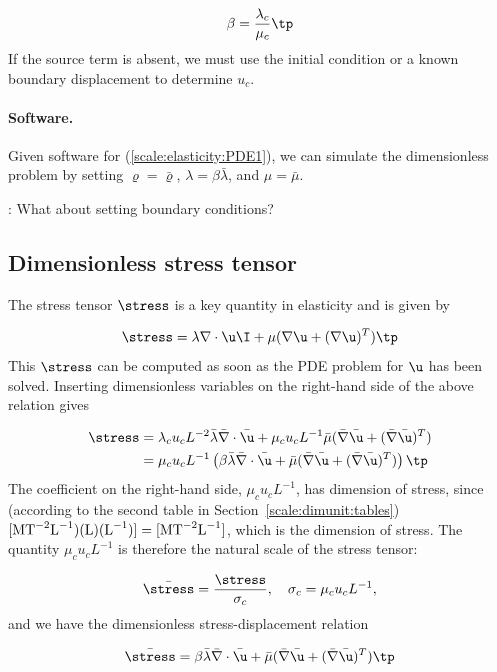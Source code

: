 \documentclass[graybox,envcountchap,sectrefs,final]{svmonodo}
\newcommand{\shortinlinecomment}[3]{{\color{red}{\bf #1}: #2}}
\begin{document}
\[ \beta = \frac{\lambda_c}{\mu_c}\tp\]
If the source term is absent, we must use the initial condition or
a known boundary displacement to
determine $u_c$.

\paragraph{Software.}
Given software for (\ref{scale:elasticity:PDE1}),
we can simulate the dimensionless problem by setting $\varrho =\bar\varrho$,
$\lambda =\beta\bar\lambda$, and $\mu = \bar\mu$.

\shortinlinecomment{hpl 3}{ What about setting boundary conditions? }{ What about setting boundary }

\subsection{Dimensionless stress tensor}
\label{scale:elasticity:PDE1:stress}

The stress tensor $\stress$ is a key quantity in elasticity and is given by

\[ \stress = \lambda\nabla\cdot\u\I + \mu(\nabla\u + (\nabla\u)^T)\tp\]
This $\stress$ can be computed as soon as the PDE problem for $\u$
has been solved.
Inserting dimensionless variables on the right-hand side of the above
relation gives

\begin{align*}
\stress &= \lambda_cu_cL^{-2}\bar\lambda\bar\nabla\cdot\bar\u
+ \mu_cu_cL^{-1}\bar\mu(\bar\nabla\bar\u + (\bar\nabla\bar\u)^T)\\ 
&= \mu_c u_cL^{-1}\left(\beta\bar\lambda\bar\nabla\cdot\bar\u +
\bar\mu(\bar\nabla\bar\u + (\bar\nabla\bar\u)^T)\right)\tp
\end{align*}
The coefficient on the right-hand side, $\mu_c u_cL^{-1}$, has dimension
of stress, since (according to the second table in
Section~\ref{scale:dimunit:tables}) $[\hbox{M}\hbox{T}^{-2}\hbox{L}^{-1})(\hbox{L})(\hbox{L}^{-1})]
=[\hbox{M}\hbox{T}^{-2}\hbox{L}^{-1}]$, which is the dimension of stress.
The quantity $\mu_c u_cL^{-1}$ is therefore the natural scale of the
stress tensor:

\[ \bar\stress = \frac{\stress}{\sigma_c},\quad \sigma_c = \mu_c u_c L^{-1},\]
and we have the dimensionless stress-displacement relation

\begin{equation}
\bar\stress =
\beta\bar\lambda\bar\nabla\cdot\bar\u +
\bar\mu(\bar\nabla\bar\u + (\bar\nabla\bar\u)^T)\tp
\end{equation}
\end{document}

